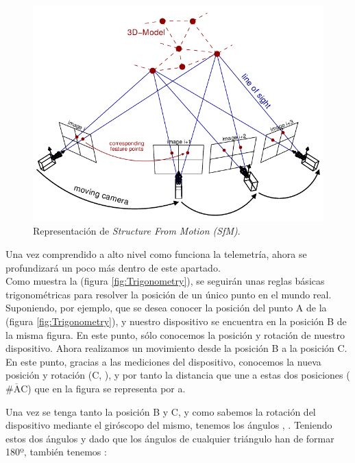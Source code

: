 \begin{figure}[h]
    \centering
    \includegraphics[scale=0.40]{Images/NubeDePuntos/StructureFromMotion(SFM).png}
    \caption[Representación de \textit{Structure From Motion (SfM)}]{Representación de \textit{Structure From Motion (SfM)}.}
    \label{fig:SFM}
\end{figure} 

Una vez comprendido a alto nivel como funciona la telemetría, ahora se profundizará un poco más dentro de este apartado.\\

Como muestra la (figura \ref{fig:Trigonometry}), se seguirán unas reglas básicas trigonométricas para resolver la posición de un único punto en el mundo real. \\

Suponiendo, por ejemplo, que se desea conocer la posición del punto A de la (figura \ref{fig:Trigonometry}), y nuestro dispositivo se encuentra en la posición B de la misma figura.
En este punto, sólo conocemos la posición y rotación de nuestro dispositivo.
Ahora realizamos un movimiento desde la posición B a la posición C. En este punto, gracias a las mediciones del dispositivo, conocemos la nueva posición y rotación (C, \textgamma), y por tanto la distancia que une a estas dos posiciones ($\overline{\mbox{#AC}}$)  que en la figura se representa por a.

Una vez se tenga tanto la posición B y C, y como sabemos la rotación del dispositivo mediante el giróscopo del mismo, tenemos los ángulos \textbeta, \textgamma. Teniendo estos dos ángulos y dado que los ángulos de cualquier triángulo han de formar 180º, también tenemos \textalpha:

